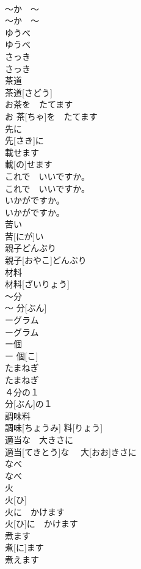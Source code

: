 \documentclass[8pt]{extreport}
\begin{document}
\begin{CJK}{UTF8}{min}
\\	〜か　〜	
\\	〜か　〜	
\\	ゆうべ	
\\	ゆうべ	
\\	さっき	
\\	さっき	
\\	茶道	
\\	茶道[さどう]	
\\	お茶を　たてます	
\\	お 茶[ちゃ]を　たてます	
\\	先に	
\\	先[さき]に	
\\	載せます	
\\	載[の]せます	
\\	これで　いいですか。	
\\	これで　いいですか。	
\\	いかがですか。	
\\	いかがですか。	
\\	苦い	
\\	苦[にが]い	
\\	親子どんぶり	
\\	親子[おやこ]どんぶり	
\\	材料	
\\	材料[ざいりょう]	
\\	〜分	
\\	〜 分[ぶん]	
\\	ーグラム	
\\	ーグラム	
\\	ー個	
\\	ー 個[こ]	
\\	たまねぎ	
\\	たまねぎ	
\\	４分の１
\\	分[ぶん]の１
\\	調味料	
\\	調味[ちょうみ] 料[りょう]	
\\	適当な　大きさに	
\\	適当[てきとう]な　 大[おお]きさに	
\\	なべ	
\\	なべ	
\\	火	
\\	火[ひ]	
\\	火に　かけます	
\\	火[ひ]に　かけます	
\\	煮ます	
\\	煮[に]ます	
\\	煮えます	

\end{CJK}
\end{document}
